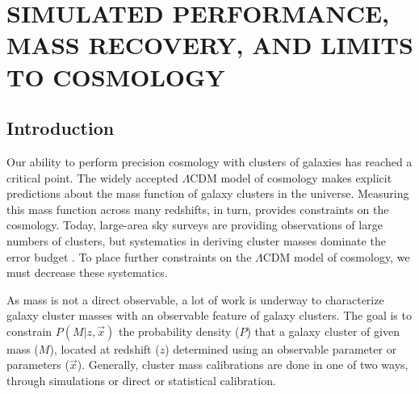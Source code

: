 %
%
%


\renewcommand*{\thefootnote}{\fnsymbol{footnote}}
\chapter[\uppercase{Simulated Performance, Mass Recovery, and Limits to Cosmology}]{\uppercase{Simulated Performance, Mass Recovery, and Limits to Cosmology} }
\renewcommand*{\thefootnote}{\arabic{footnote}}\label{Chapter1}
\setcounter{footnote}{0}

\section{Introduction}\label{sec: Introduction}
Our ability to perform precision cosmology with clusters of galaxies has reached a critical point. The widely accepted $\Lambda$CDM model of cosmology makes explicit predictions about the mass function of galaxy clusters in the universe. Measuring this mass function across many redshifts, in turn, provides constraints on the cosmology. Today, large-area sky surveys are providing observations of large numbers of clusters, but systematics in deriving cluster masses dominate the error budget . To place further constraints on the $\Lambda$CDM model of cosmology, we must decrease these systematics. 

As mass is not a direct observable, a lot of work is underway to characterize galaxy cluster masses with an observable feature of galaxy clusters. The goal is to constrain $P(M|z, \vec{x})$ the probability density ($P$) that a galaxy cluster of given mass ($M$), located at redshift ($z$) determined using an observable parameter or parameters ($\vec{x}$). Generally, cluster mass calibrations are done in one of two ways, through simulations or direct or statistical calibration.

